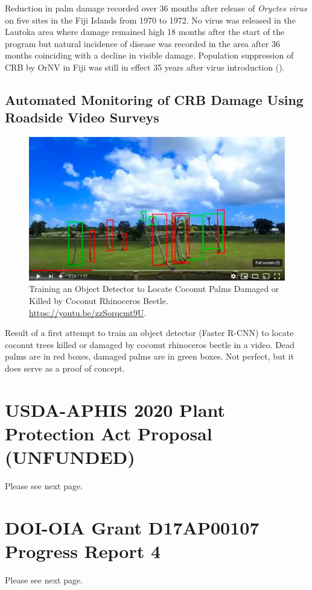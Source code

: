 \documentclass[12pt,letterpaper,english,bibliography=totocnumbered, abstract=on]{scrartcl}
\begin{document}
Reduction in palm damage recorded over 36 months after release of \textit{Oryctes virus} on five sites in the Fiji Islands from 1970 to 1972. No virus was released in the Lautoka area where damage remained high 18 months after the start of the program but natural incidence of disease was recorded in the area after 36 months coinciding with a decline in visible damage. Population suppression of CRB by OrNV in Fiji was still in effect 35 years after virus introduction (\cite{bedford_g._o._long-term_2013}).

\clearpage

\subsection{Automated Monitoring of CRB Damage Using Roadside Video Surveys}

\begin{figure}[h]
\centering
\includegraphics[width=0.7\linewidth]{images/royal-palms}
\caption{Training an Object Detector to Locate Coconut Palms Damaged or Killed by Coconut Rhinoceros Beetle. \url{https://youtu.be/zzSorqcmt9U}.}
\label{fig:royal-palms}
\end{figure}

Result of a first attempt to train an object detector (Faster R-CNN) to locate coconut trees killed or damaged by coconut rhinoceros beetle in a video. Dead palms are in red boxes, damaged palms are in green boxes. Not perfect, but it does serve as a proof of concept.

\clearpage



\section{USDA-APHIS 2020 Plant Protection Act Proposal (UNFUNDED)}
Please see next page.


\section{DOI-OIA Grant D17AP00107 Progress Report 4}
\label{section report4}
Please see next page.

\end{document}
